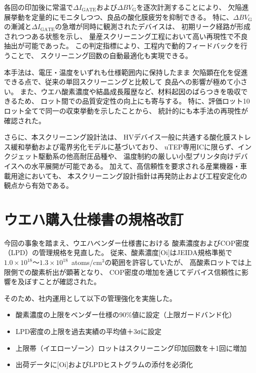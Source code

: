 \documentclass[twocolumn]{ieeetran}
\begin{document}
各回の印加後に常温で$\Delta I_\mathrm{GATE}$および$\Delta BV_\mathrm{G}$を逐次計測することにより、
欠陥進展挙動を定量的にモニタしつつ、良品の酸化膜疲労を抑制できる。
特に、$\Delta BV_\mathrm{G}$の漸減と$\Delta I_\mathrm{GATE}$の急増が同時に観測されたデバイスは、
初期リーク経路が形成されつつある状態を示し、
量産スクリーニング工程において高い再現性で不良抽出が可能であった。
この判定指標により、工程内で動的フィードバックを行うことで、
スクリーニング回数の自動最適化も実現できる。

本手法は、電圧・温度をいずれも仕様範囲内に保持したまま
欠陥顕在化を促進できる点で、従来の単回スクリーニングと比較して
良品への影響が極めて小さい。
また、ウエハ酸素濃度や結晶成長履歴など、材料起因のばらつきを吸収できるため、
ロット間での品質安定性の向上にも寄与する。
特に、評価ロット10ロット全てで同一の収束挙動を示したことから、
統計的にも本手法の再現性が確認された。

さらに、本スクリーニング設計法は、
HVデバイス一般に共通する酸化膜ストレス緩和挙動および電界劣化モデルに基づいており、
uTEP専用ICに限らず、インクジェット駆動系の他高耐圧品種や、
温度制約の厳しい小型プリンタ向けデバイスへの水平展開が可能である。
加えて、高信頼性を要求される産業機器・車載用途においても、
本スクリーニング設計指針は再発防止および工程安定化の観点から有効である。

\section{ウエハ購入仕様書の規格改訂}

今回の事象を踏まえ、ウエハベンダー仕様書における
酸素濃度およびCOP密度（LPD）の管理規格を見直した。
従来、酸素濃度[Oi]はJEIDA規格準拠で
$1.0\times10^{18}$～$1.3\times10^{18}$~atoms/cm$^3$の範囲を許容していたが、
高酸素ロットでは上限側での酸素析出が顕著となり、
COP密度の増加を通じてデバイス信頼性に影響を及ぼすことが確認された。

そのため、社内運用として以下の管理強化を実施した。

\begin{itemize}
  \item 酸素濃度の上限をベンダー仕様の90\%値に設定（上限ガードバンド化）
  \item LPD密度の上限を過去実績の平均値＋3σに設定
  \item 上限帯（イエローゾーン）ロットはスクリーニング印加回数を＋1回に増加
  \item 出荷データに[Oi]およびLPDヒストグラムの添付を必須化
\end{itemize}
\end{document}
